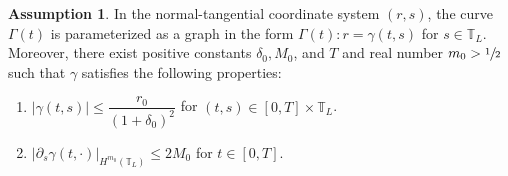 \documentclass[11pt]{article}
\newenvironment{enumeratei}
{\bgroup\def\theenumi{\roman{enumi}}\def\theenumii{\arabic{enumii}}\begin{enumerate}}
{\end{enumerate}\egroup}
\newcommand{\itGamma}{\mathit{\Gamma}}
\theoremstyle{definition}
\newtheorem{assumption}[theorem]{Assumption}
\begin{document}
\begin{assumption}\label{ass:CL}
In the normal-tangential coordinate system $(r,s)$,
the curve $\itGamma(t)$ is parameterized as a graph in the form $\itGamma(t): r=\gamma(t,s)$ for $s\in\mathbb{T}_L$.
Moreover, there exist positive constants $\delta_0,M_0$, and $T$ and real number $m_0>\sfrac12$ such that $\gamma$ satisfies the following properties:
\begin{enumeratei}
\item\label{ass:CLi}
$|\gamma(t,s)| \leq \dfrac{r_0}{(1+\delta_0)^2}$ for $(t,s)\in[0,T]\times\mathbb{T}_L$.

\item\label{ass:CLii}
$|\partial_s\gamma(t,\cdot)|_{H^{m_0}(\mathbb{T}_L)} \leq 2 M_0$ for $t\in[0,T]$.
\end{enumeratei}
\end{assumption}
\end{document}
